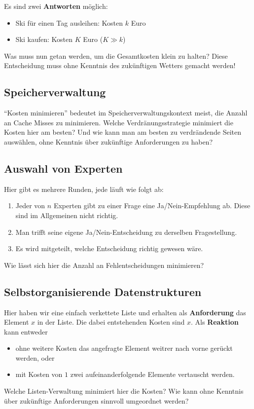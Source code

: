Es sind zwei \textbf{Antworten} möglich:
\begin{itemize}
  \item Ski für einen Tag ausleihen: Kosten \( k \) Euro
  \item Ski kaufen: Kosten \( K \) Euro (\( K \gg k \))
\end{itemize}

Was muss nun getan werden, um die Gesamtkosten klein zu halten? Diese Entscheidung muss ohne Kenntnis des zukünftigen Wetters gemacht werden!

\subsection{Speicherverwaltung}

``Kosten minimieren'' bedeutet im Speicherverwaltungskontext meist, die Anzahl an Cache Misses zu minimieren. Welche Verdränungsstrategie minimiert die Kosten hier am besten? Und wie kann man am besten zu verdrändende Seiten auswählen, ohne Kenntnis über zukünftige Anforderungen zu haben?

\subsection{Auswahl von Experten}

Hier gibt es mehrere Runden, jede läuft wie folgt ab:
\begin{enumerate}
  \item Jeder von \( n \) Experten gibt zu einer Frage eine Ja/Nein-Empfehlung ab. Diese sind im Allgemeinen nicht richtig.
  \item Man trifft seine eigene Ja/Nein-Entscheidung zu derselben Fragestellung.
  \item Es wird mitgeteilt, welche Entscheidung richtig gewesen wäre.
\end{enumerate}

Wie lässt sich hier die Anzahl an Fehlentscheidungen minimieren?

\subsection{Selbstorganisierende Datenstrukturen}

Hier haben wir eine einfach verkettete Liste und erhalten als \textbf{Anforderung} das Element \( x \) in der Liste. Die dabei entstehenden Kosten sind \( x \). Als \textbf{Reaktion} kann entweder
\begin{itemize}
  \item ohne weitere Kosten das angefragte Element weitrer nach vorne gerückt werden, oder
  \item mit Kosten von \( 1 \) zwei aufeinanderfolgende Elemente vertauscht werden.
\end{itemize}

Welche Listen-Verwaltung minimiert hier die Kosten? Wie kann ohne Kenntnis über zukünftige Anforderungen sinnvoll umgeordnet werden?